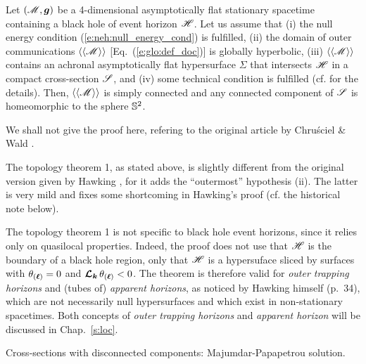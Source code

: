 \begin{prop}
Let $(\mathscr{M}, \bm{g})$ be a 4-dimensional asymptotically flat stationary spacetime
containing a black hole of event horizon $\mathscr{H}$.
Let us assume that (i) the
null energy condition (\ref{e:neh:null_energy_cond}) is fulfilled,
(ii) the domain of outer communications $\langle\langle \mathscr{M}\rangle\rangle$
[Eq.~(\ref{e:glo:def_doc})]
is globally hyperbolic,
(iii) $\langle\langle \mathscr{M}\rangle\rangle$ contains an achronal asymptotically
flat hypersurface $\Sigma$ that intersects $\mathscr{H}$ in a compact cross-section $\mathscr{S}$,
and (iv) some technical condition is fulfilled (cf. \cite{ChrusW94b} for the details).
Then, $\langle\langle \mathscr{M}\rangle\rangle$ is simply connected and
any connected component of $\mathscr{S}$ is homeomorphic to the sphere $\mathbb{S}^2$.
\end{prop}
We shall not give the proof here, refering to the original article by Chru\'sciel
\& Wald \cite{ChrusW94b}.

\begin{remark}
The topology theorem 1, as stated above, is slightly different from the original
version given by Hawking \cite{Hawki72,Hawki73,HawkiE73}, for it adds the ``outermost'' hypothesis (ii).
The latter is very mild and fixes some shortcoming in Hawking's proof
(cf. the historical note below).
\end{remark}

\begin{remark}
The topology theorem 1 is not specific to black hole event horizons, since
it relies only on quasilocal properties. Indeed, the proof does not use
that $\mathscr{H}$ is the boundary of a black hole region, only that $\mathscr{H}$ is a hypersuface
sliced by surfaces with $\theta_{(\bm{\ell})} = 0$ and $\bm{\mathcal{L}}_{\bm{\bm{k}}}\, \theta_{(\bm{\ell})} < 0$.
The theorem is therefore valid for \emph{outer trapping horizons} \cite{Haywa94}
and (tubes of) \emph{apparent horizons}, as noticed by Hawking himself \cite{Hawki73} (p.~34),
which are not necessarily null hypersurfaces and which exist in non-stationary spacetimes.
Both concepts of \emph{outer trapping horizons} and \emph{apparent horizon}
will be discussed in Chap.~\ref{s:loc}.
\end{remark}



\begin{remark}
Cross-sections with disconnected components: Majumdar-Papapetrou solution.
\end{remark}

